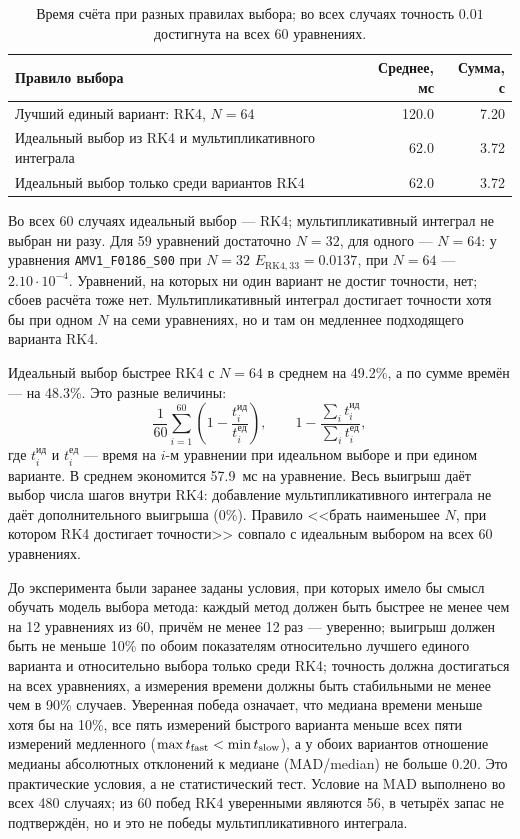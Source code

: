 \documentclass[14pt,a4paper]{extarticle}
\begin{document}
\begin{table}[!htbp]
\centering
\caption{Время счёта при разных правилах выбора; во всех случаях
точность $0.01$ достигнута на всех 60 уравнениях.}
\label{tab:costpilot-selection}
\small
\begin{tabular}{>{\raggedright\arraybackslash}p{}rr}
\toprule
Правило выбора & Среднее, мс & Сумма, с\\
\midrule
Лучший единый вариант: RK4, $N=64$ & 120.0 & 7.20\\
Идеальный выбор из RK4 и мультипликативного интеграла & 62.0 & 3.72\\
Идеальный выбор только среди вариантов RK4 & 62.0 & 3.72\\
\bottomrule
\end{tabular}
\end{table}

Во всех 60 случаях идеальный выбор --- RK4; мультипликативный интеграл
не выбран ни разу. Для 59 уравнений достаточно $N=32$, для одного ---
$N=64$: у уравнения \texttt{AMV1\_F0186\_S00} при $N=32$
$E_{\mathrm{RK4},33}=0.0137$, при $N=64$ --- $2.10\cdot10^{-4}$.
Уравнений, на которых ни один вариант не достиг точности, нет; сбоев
расчёта тоже нет. Мультипликативный интеграл достигает точности хотя бы
при одном $N$ на семи уравнениях, но и там он медленнее подходящего
варианта RK4.

Идеальный выбор быстрее RK4 с $N=64$ в среднем на 49.2\%, а по сумме
времён --- на 48.3\%. Это разные величины:
\[
\frac1{60}\sum_{i=1}^{60}
\left(1-\frac{t_i^{\mathrm{ид}}}{t_i^{\mathrm{ед}}}\right),
\qquad
1-\frac{\sum_i t_i^{\mathrm{ид}}}{\sum_i t_i^{\mathrm{ед}}},
\]
где $t_i^{\mathrm{ид}}$ и $t_i^{\mathrm{ед}}$ --- время на $i$-м уравнении
при идеальном выборе и при едином варианте. В среднем экономится
57.9~мс на уравнение. Весь выигрыш даёт выбор числа шагов внутри RK4:
добавление мультипликативного интеграла не даёт дополнительного
выигрыша ($0\%$). Правило <<брать наименьшее $N$, при котором RK4
достигает точности>> совпало с идеальным выбором на всех 60 уравнениях.

До эксперимента были заранее заданы условия, при которых имело бы смысл
обучать модель выбора метода: каждый метод должен быть быстрее не менее
чем на 12 уравнениях из 60, причём не менее 12 раз --- уверенно; выигрыш
должен быть не меньше 10\% по обоим показателям относительно лучшего
единого варианта и относительно выбора только среди RK4; точность
должна достигаться на всех уравнениях, а измерения времени должны быть
стабильными не менее чем в 90\% случаев. Уверенная победа означает,
что медиана времени меньше хотя бы на 10\%, все пять измерений
быстрого варианта меньше всех пяти измерений медленного
($\max t_{\rm fast}<\min t_{\rm slow}$), а у обоих вариантов отношение
медианы абсолютных отклонений к медиане (MAD/median) не больше $0.20$.
Это практические условия, а не статистический тест. Условие на MAD
выполнено во всех 480 случаях; из 60 побед RK4 уверенными являются 56,
в четырёх запас не подтверждён, но и это не победы мультипликативного
интеграла.
\end{document}
